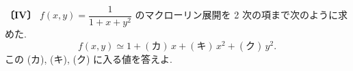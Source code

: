 \noindent\textbf{〔IV〕}
$f(x,y)=\dfrac{1}{1+x+y^2}$ のマクローリン展開を 2 次の項まで次のように求めた.
\[
f(x,y)\simeq 1+(\text{カ})\,x+(\text{キ})\,x^2+(\text{ク})\,y^2.
\]
この (カ), (キ), (ク) に入る値を答えよ.
